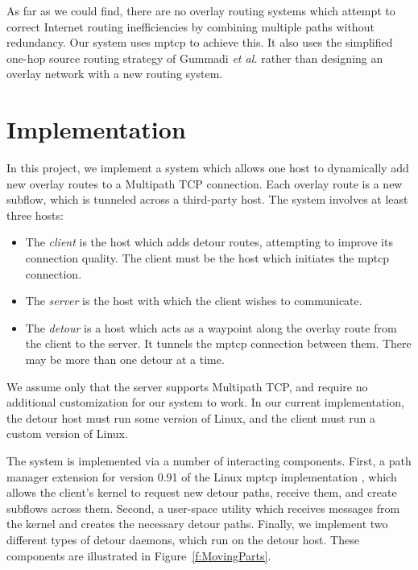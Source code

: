 \documentclass{cwru}
\begin{document}
As far as we could find, there are no overlay routing systems which attempt to
correct Internet routing inefficiencies by combining multiple paths without
redundancy. Our system uses \ac{mptcp} to achieve this. It also uses the
simplified one-hop source routing strategy of Gummadi \textit{et al.}
\cite{gummadi2004improving} rather than designing an overlay network with a new
routing system.


\chapter{Implementation}
\label{c:impl}


In this project, we implement a system which allows one host to dynamically add
new overlay routes to a Multipath TCP connection. Each overlay route is a new
subflow, which is tunneled across a third-party host. The system involves at
least three hosts:
\begin{itemize}
\item The \emph{client} is the host which adds detour routes, attempting to
  improve its connection quality. The client must be the host which initiates
  the \ac{mptcp} connection.
\item The \emph{server} is the host with which the client wishes to communicate.
\item The \emph{detour} is a host which acts as a waypoint along the overlay
  route from the client to the server. It tunnels the \ac{mptcp} connection
  between them. There may be more than one detour at a time.
\end{itemize}

We assume only that the server supports Multipath TCP, and require no additional
customization for our system to work. In our current implementation, the detour
host must run some version of Linux, and the client must run a custom version of
Linux.

The system is implemented via a number of interacting components. First, a path
manager extension for version 0.91 of the Linux \ac{mptcp} implementation
\cite{mptcp}, which allows the client's kernel to request new detour paths,
receive them, and create subflows across them. Second, a user-space utility
which receives messages from the kernel and creates the necessary detour paths.
Finally, we implement two different types of detour daemons, which run on the
detour host. These components are illustrated in Figure~\ref{f:MovingParts}.
\end{document}
